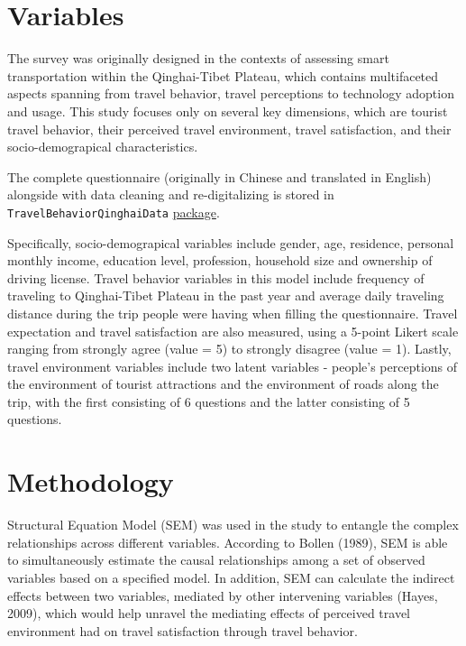 \documentclass[
11pt, %
oneside, %
english, %
singlespacing, %
]{macthesis} %
\begin{document}
\section{Variables}\label{variables}

The survey was originally designed in the contexts of assessing smart transportation within the Qinghai-Tibet Plateau, which contains multifaceted aspects spanning from travel behavior, travel perceptions to technology adoption and usage. This study focuses only on several key dimensions, which are tourist travel behavior, their perceived travel environment, travel satisfaction, and their socio-demograpical characteristics.

The complete questionnaire (originally in Chinese and translated in English) alongside with data cleaning and re-digitalizing is stored in \texttt{TravelBehaviorQinghaiData} \href{https://github.com/Horan517/TravelBehaviorQinghaiData}{package}.

Specifically, socio-demograpical variables include gender, age, residence, personal monthly income, education level, profession, household size and ownership of driving license. Travel behavior variables in this model include frequency of traveling to Qinghai-Tibet Plateau in the past year and average daily traveling distance during the trip people were having when filling the questionnaire. Travel expectation and travel satisfaction are also measured, using a 5-point Likert scale ranging from strongly agree (value = 5) to strongly disagree (value = 1). Lastly, travel environment variables include two latent variables - people's perceptions of the environment of tourist attractions and the environment of roads along the trip, with the first consisting of 6 questions and the latter consisting of 5 questions.

\section{Methodology}\label{methodology}

Structural Equation Model (SEM) was used in the study to entangle the complex relationships across different variables. According to Bollen (1989), SEM is able to simultaneously estimate the causal relationships among a set of observed variables based on a specified model. In addition, SEM can calculate the indirect effects between two variables, mediated by other intervening variables (Hayes, 2009), which would help unravel the mediating effects of perceived travel environment had on travel satisfaction through travel behavior.
\end{document}
